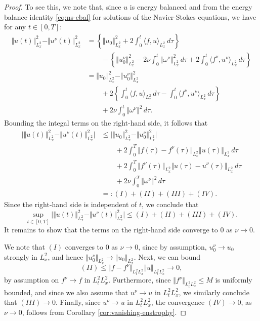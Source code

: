 \documentclass[reqno,12pt]{amsart}
\begin{document}
\begin{proof}
To see this, we note that, since $u$ is energy balanced and from the energy balance identity \eqref{eq:ns-ebal} for solutions of the Navier-Stokes equations, we have for any $t\in [0,T]$:
\begin{align*}
\Vert u(t) \Vert^2_{L^2_x} - \Vert u^\nu(t) \Vert^2_{L^2_x}
&=
\left\{
\Vert u_0 \Vert^2_{L^2_x} + 2 \int_0^t \langle f, u \rangle_{L^2_x} \, d\tau
\right\}
\\
&\qquad
- \left\{
\Vert u^\nu_0 \Vert^2_{L^2_x} - 2\nu \int_0^t \Vert \omega^\nu \Vert^2_{L^2_x} \, d\tau + 2 \int_0^t \langle f^\nu, u^\nu \rangle_{L^2_x} \, d\tau
\right\}
\\
&=
\Vert u_0 \Vert^2_{L^2_x} - \Vert u^\nu_0 \Vert^2_{L^2_x}
\\
&\qquad + 2 \left\{
\int_0^t \langle f, u \rangle_{L^2_x} \, d\tau
- \int_0^t \langle f^\nu, u^\nu \rangle_{L^2_x} \, d\tau
\right\}
\\
&\qquad +2 \nu \int_0^t \Vert \omega^\nu \Vert^2 \, d\tau.
\end{align*}
Bounding the integal terms on the right-hand side, it follows that
\begin{align*}
\Big|
\Vert u(t) \Vert^2_{L^2_x} - \Vert u^\nu(t) \Vert^2_{L^2_x}
\Big|
&\le
\Big|
\Vert u_0 \Vert^2_{L^2_x} - \Vert u^\nu_0 \Vert^2_{L^2_x}
\Big|
\\
&\qquad + 2\int_0^T \Vert f(\tau) - f^\nu(\tau) \Vert_{L^2_x} \Vert u(\tau) \Vert_{L^2_x} \, d\tau
\\
&\qquad + 2\int_0^T \Vert f^\nu(\tau) \Vert_{L^2_x} \Vert u(\tau) - u^\nu(\tau) \Vert_{L^2_x} \, d\tau
\\
&\qquad +2 \nu \int_0^T \Vert \omega^\nu \Vert^2 \, d\tau
\\
&=: (I) + (II) + (III) + (IV).
\end{align*}
Since the right-hand side is independent of $t$, we conclude that
\[
\sup_{t\in [0,T]} \Big|
\Vert u(t) \Vert^2_{L^2_x} - \Vert u^\nu(t) \Vert^2_{L^2_x}
\Big|
\le (I) + (II) + (III) + (IV).
\]
It remains to show that the terms on the right-hand side converge to $0$ as $\nu \to 0$.

We note that $(I)$ converges to $0$ as $\nu \to 0$, since by assumption, $u^\nu_0 \to u_0$ strongly in $L^2_x$, and hence $\Vert u^\nu_0 \Vert_{L^2_x} \to \Vert u_0 \Vert_{L^2_x}$. Next, we can bound
\[
(II) \le \Vert f- f^\nu \Vert_{L^2_tL^2_x} \Vert u \Vert_{L^2_t L^2_x} \to 0,
\]
by assumption on $f^\nu \to f$ in $L^2_t L^2_x$. Furthermore, since $\Vert f^\nu \Vert_{L^2_tL^2_x}\le M$ is uniformly bounded, and since we also assume that $u^\nu \to u$ in $L^2_tL^2_x$, we similarly conclude that $(III)\to 0$. Finally, since $u^\nu \to u$ in $L^2_tL^2_x$, the convergence $(IV)\to 0$, as $\nu \to 0$, follows from Corollary \ref{cor:vanishing-enstrophy}.


\end{proof}
\end{document}
